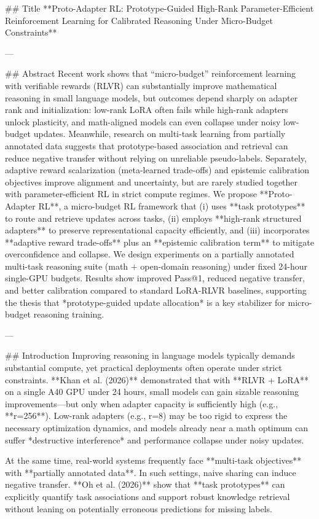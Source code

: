 ## Title  
**Proto-Adapter RL: Prototype-Guided High-Rank Parameter-Efficient Reinforcement Learning for Calibrated Reasoning Under Micro-Budget Constraints**

---

## Abstract  
Recent work shows that “micro-budget” reinforcement learning with verifiable rewards (RLVR) can substantially improve mathematical reasoning in small language models, but outcomes depend sharply on adapter rank and initialization: low-rank LoRA often fails while high-rank adapters unlock plasticity, and math-aligned models can even collapse under noisy low-budget updates. Meanwhile, research on multi-task learning from partially annotated data suggests that prototype-based association and retrieval can reduce negative transfer without relying on unreliable pseudo-labels. Separately, adaptive reward scalarization (meta-learned trade-offs) and epistemic calibration objectives improve alignment and uncertainty, but are rarely studied together with parameter-efficient RL in strict compute regimes.  
We propose **Proto-Adapter RL**, a micro-budget RL framework that (i) uses **task prototypes** to route and retrieve updates across tasks, (ii) employs **high-rank structured adapters** to preserve representational capacity efficiently, and (iii) incorporates **adaptive reward trade-offs** plus an **epistemic calibration term** to mitigate overconfidence and collapse. We design experiments on a partially annotated multi-task reasoning suite (math + open-domain reasoning) under fixed 24-hour single-GPU budgets. Results show improved Pass@1, reduced negative transfer, and better calibration compared to standard LoRA-RLVR baselines, supporting the thesis that *prototype-guided update allocation* is a key stabilizer for micro-budget reasoning training.

---

## Introduction  
Improving reasoning in language models typically demands substantial compute, yet practical deployments often operate under strict constraints. **Khan et al. (2026)** demonstrated that with **RLVR + LoRA** on a single A40 GPU under 24 hours, small models can gain sizable reasoning improvements—but only when adapter capacity is sufficiently high (e.g., **r=256**). Low-rank adapters (e.g., r=8) may be too rigid to express the necessary optimization dynamics, and models already near a math optimum can suffer *destructive interference* and performance collapse under noisy updates.

At the same time, real-world systems frequently face **multi-task objectives** with **partially annotated data**. In such settings, naive sharing can induce negative transfer. **Oh et al. (2026)** show that **task prototypes** can explicitly quantify task associations and support robust knowledge retrieval without leaning on potentially erroneous predictions for missing labels.

